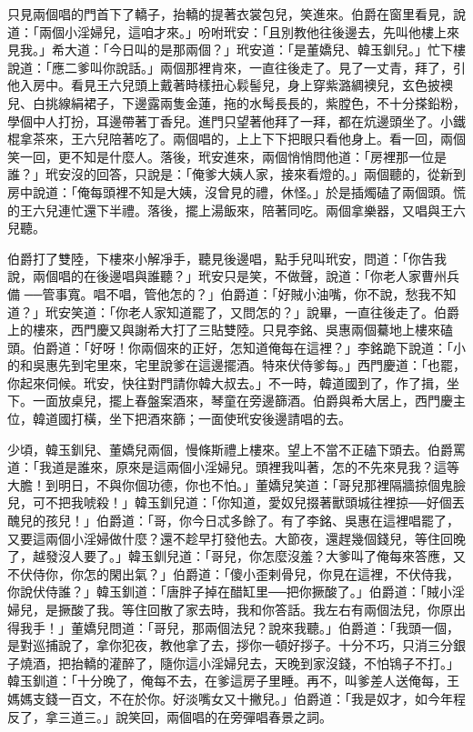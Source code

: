 只見兩個唱的門首下了轎子，抬轎的提著衣裳包兒，笑進來。伯爵在窗里看見，說道：「兩個小淫婦兒，這咱才來。」吩咐玳安：「且別教他往後邊去，先叫他樓上來見我。」希大道：「今日叫的是那兩個？」玳安道：「是董嬌兒、韓玉釧兒。」忙下樓說道：「應二爹叫你說話。」兩個那裡肯來，一直往後走了。見了一丈青，拜了，引他入房中。看見王六兒頭上戴著時樣扭心鬏髻兒，身上穿紫潞綢襖兒，玄色披襖兒、白挑線絹裙子，下邊露兩隻金蓮，拖的水髩長長的，紫膛色，不十分搽鉛粉，學個中人打扮，耳邊帶著丁香兒。進門只望著他拜了一拜，都在炕邊頭坐了。小鐵棍拿茶來，王六兒陪著吃了。兩個唱的，上上下下把眼只看他身上。看一回，兩個笑一回，更不知是什麼人。落後，玳安進來，兩個悄悄問他道：「房裡那一位是誰？」玳安沒的回答，只說是：「俺爹大姨人家，接來看燈的。」兩個聽的，從新到房中說道：「俺每頭裡不知是大姨，沒曾見的禮，休怪。」於是插燭磕了兩個頭。慌的王六兒連忙還下半禮。落後，擺上湯飯來，陪著同吃。兩個拿樂器，又唱與王六兒聽。

伯爵打了雙陸，下樓來小解凈手，聽見後邊唱，點手兒叫玳安，問道：「你告我說，兩個唱的在後邊唱與誰聽？」玳安只是笑，不做聲，說道：「你老人家曹州兵備 ──管事寬。唱不唱，管他怎的？」伯爵道：「好賊小油嘴，你不說，愁我不知道？」玳安笑道：「你老人家知道罷了，又問怎的？」說畢，一直往後走了。伯爵上的樓來，西門慶又與謝希大打了三貼雙陸。只見李銘、吳惠兩個驀地上樓來磕頭。伯爵道：「好呀！你兩個來的正好，怎知道俺每在這裡？」李銘跪下說道：「小的和吳惠先到宅里來，宅里說爹在這邊擺酒。特來伏侍爹每。」西門慶道：「也罷，你起來伺候。玳安，快往對門請你韓大叔去。」不一時，韓道國到了，作了揖，坐下。一面放桌兒，擺上春盤案酒來，琴童在旁邊篩酒。伯爵與希大居上，西門慶主位，韓道國打橫，坐下把酒來篩；一面使玳安後邊請唱的去。

少頃，韓玉釧兒、董嬌兒兩個，慢條斯禮上樓來。望上不當不正磕下頭去。伯爵罵道：「我道是誰來，原來是這兩個小淫婦兒。頭裡我叫著，怎的不先來見我？這等大膽！到明日，不與你個功德，你也不怕。」董嬌兒笑道：「哥兒那裡隔牆掠個鬼臉兒，可不把我唬殺！」韓玉釧兒道：「你知道，愛奴兒掇著獸頭城往裡掠──好個丟醜兒的孩兒！」伯爵道：「哥，你今日忒多餘了。有了李銘、吳惠在這裡唱罷了，又要這兩個小淫婦做什麼？還不趁早打發他去。大節夜，還趕幾個錢兒，等住回晚了，越發沒人要了。」韓玉釧兒道：「哥兒，你怎麼沒羞？大爹叫了俺每來答應，又不伏侍你，你怎的閑出氣？」伯爵道：「傻小歪剌骨兒，你見在這裡，不伏侍我，你說伏侍誰？」韓玉釧道：「唐胖子掉在醋缸里──把你撅酸了。」伯爵道：「賊小淫婦兒，是撅酸了我。等住回散了家去時，我和你答話。我左右有兩個法兒，你原出得我手！」董嬌兒問道：「哥兒，那兩個法兒？說來我聽。」伯爵道：「我頭一個，是對巡捕說了，拿你犯夜，教他拿了去，拶你一頓好拶子。十分不巧，只消三分銀子燒酒，把抬轎的灌醉了，隨你這小淫婦兒去，天晚到家沒錢，不怕鴇子不打。」韓玉釧道：「十分晚了，俺每不去，在爹這房子里睡。再不，叫爹差人送俺每，王媽媽支錢一百文，不在於你。好淡嘴女又十撇兒。」伯爵道：「我是奴才，如今年程反了，拿三道三。」說笑回，兩個唱的在旁彈唱春景之詞。

